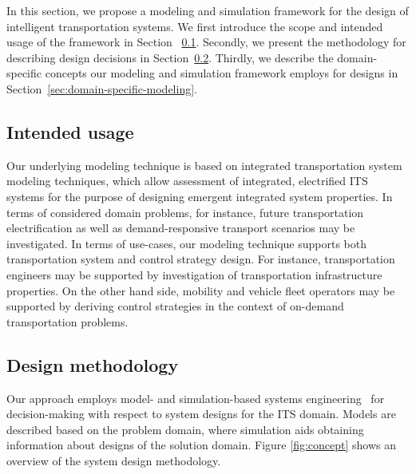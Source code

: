 \documentclass[a4paper,twoside]{article}
\begin{document}
	In this section, we propose a modeling and simulation framework for the design of intelligent transportation systems.
	We first introduce the scope and intended usage of the framework in Section ~\ref{sec:scope}.
	Secondly, we present the methodology for describing design decisions in Section~\ref{sec:methodology}.
	Thirdly, we describe the domain-specific concepts our modeling and simulation framework employs for designs in Section~\ref{sec:domain-specific-modeling}.
	
	\subsection{Intended usage}
	\label{sec:scope}
	
	Our underlying modeling technique is based on integrated transportation system modeling techniques, which allow assessment of integrated, electrified ITS systems for the purpose of designing emergent integrated system properties.
	In terms of considered domain problems, for instance, future transportation electrification as well as demand-responsive transport scenarios may be investigated.
	In terms of use-cases, our modeling technique supports both transportation system and control strategy design.
	For instance, transportation engineers may be supported by investigation of transportation infrastructure properties.
	On the other hand side, mobility and vehicle fleet operators may be supported by deriving control strategies in the context of on-demand transportation problems.
	
	
	\subsection{Design methodology}
	\label{sec:methodology}
	
	Our approach employs model- and simulation-based systems engineering~\cite{gianni2014modeling} for decision-making with respect to system designs for the ITS domain.
	Models are described based on the problem domain, where simulation aids obtaining information about designs of the solution domain. Figure \ref{fig:concept} shows an overview of the system design methodology.
	
\end{document}
